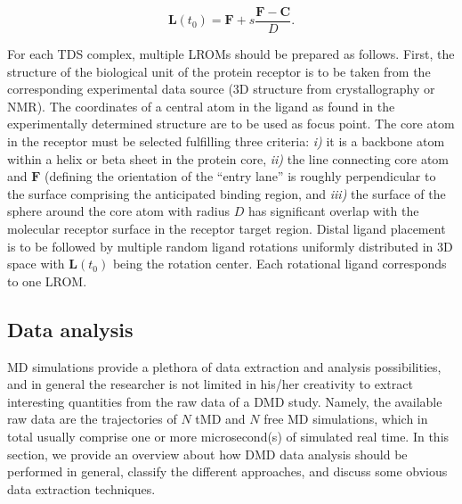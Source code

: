 \begin{equation}
\bm{L}(t_0) = \bm{F} + s \frac{\bm{F}-\bm{C}}{D}.
\end{equation}

For each TDS complex, multiple LROMs should be prepared as follows. First, the
structure of the biological unit of the protein receptor is to be taken from the
corresponding experimental data source (3D structure from crystallography or
NMR). The coordinates of a central atom in the ligand as found in the
experimentally determined structure are to be used as focus point. The core atom
in the receptor must be selected fulfilling three criteria: \textit{i)} it is a
backbone atom within a helix or beta sheet in the protein core, \textit{ii)} the
line connecting core atom and $\bm{F}$ (defining the orientation of the ``entry
lane'' is roughly perpendicular to the surface comprising the anticipated
binding region, and \textit{iii)} the surface of the sphere around the core atom
with radius $D$ has significant overlap with the molecular receptor surface in
the receptor target region. Distal ligand placement is to be followed by
multiple random ligand rotations uniformly distributed in 3D space with
$\bm{L}(t_0)$ being the rotation center. Each rotational ligand corresponds to
one LROM.

\subsection{Data analysis}
\label{dmd:dataanalysis}

MD simulations provide a plethora of data extraction and analysis possibilities,
and in general the researcher is not limited in his/her creativity to extract
interesting quantities from the raw data of a DMD study. Namely, the available
raw data are the trajectories of $N$ tMD and $N$ free MD simulations, which in
total usually comprise one or more microsecond(s) of simulated real time. In
this section, we provide an overview about how DMD data analysis should be
performed in general, classify the different approaches, and discuss some
obvious data extraction techniques.

